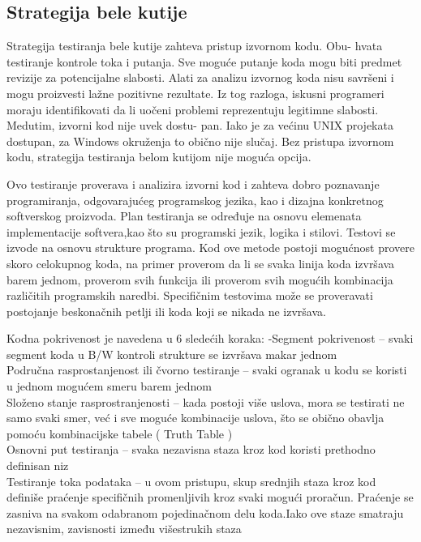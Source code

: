 \documentclass[12pt,oneside]{memoir}
\begin{document}
\subsection{Strategija bele kutije}
Strategija testiranja bele kutije zahteva pristup izvornom kodu. Obu-
hvata testiranje kontrole toka i putanja. Sve moguće putanje koda mogu
biti predmet revizije za potencijalne slabosti. Alati za analizu izvornog
koda nisu savršeni i mogu proizvesti lažne pozitivne rezultate. Iz tog
razloga, iskusni programeri moraju identifikovati da li uočeni problemi
reprezentuju legitimne slabosti. Medutim, izvorni kod nije uvek dostu-
pan. Iako je za većinu UNIX projekata dostupan, za Windows okruženja
to obično nije slučaj. Bez pristupa izvornom kodu, strategija testiranja
belom kutijom nije moguća opcija.
\par
Ovo testiranje proverava i analizira izvorni kod i zahteva dobro poznavanje programiranja,
odgovarajućeg 
programskog  jezika,  kao  i  dizajna
konkretnog  softverskog  proizvoda.  Plan  testiranja  se  određuje  na 
osnovu elemenata implementacije softvera,kao što su programski jezik, logika i stilovi. Testovi se izvode 
na osnovu strukture programa. Kod ove metode postoji mogućnost provere skoro celokupnog koda, na 
primer proverom da li se svaka linija  koda izvršava barem jednom, proverom svih funkcija ili proverom 
svih mogućih kombinacija različitih programskih naredbi. Specifičnim testovima može se proveravati 
postojanje beskonačnih petlji ili koda koji se nikada ne izvršava.
\par
Kodna pokrivenost je navedena u 6 sledećih koraka:
-Segment  pokrivenost
–  svaki  segment  koda  u 
B/W
kontroli  strukture  se  izvršava  makar 
jednom \\
Područna rasprostanjenost ili čvorno testiranje
– svaki ogranak u kodu se koristi u jednom 
mogućem smeru barem jednom \\
Složeno stanje rasprostranjenosti
– kada postoji više uslova, mora se testirati ne samo svaki 
smer, već i sve moguće kombinacije uslova, što se obično obavlja pomoću kombinacijske tabele 
(
Truth Table
)\\
Osnovni put testiranja
– svaka nezavisna staza kroz kod koristi prethodno definisan niz \\
Testiranje toka podataka
–
u ovom pristupu, skup srednjih staza kroz kod definiše praćenje 
specifičnih promenljivih kroz svaki mogući proračun. Praćenje se zasniva na svakom odabranom 
pojedinačnom delu koda.Iako ove staze smatraju nezavisnim, zavisnosti između višestrukih staza 
\end{document}
